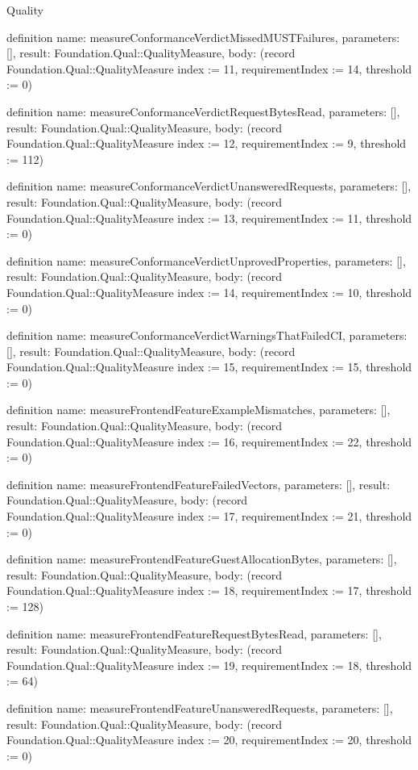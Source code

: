 \begin{lexlean}{Quality}
\begin{semanticmodule}
definition{
  name: measureConformanceVerdictMissedMUSTFailures,
  parameters: [],
  result: Foundation.Qual::QualityMeasure,
  body: (record Foundation.Qual::QualityMeasure {index := 11, requirementIndex := 14, threshold := 0})
}

definition{
  name: measureConformanceVerdictRequestBytesRead,
  parameters: [],
  result: Foundation.Qual::QualityMeasure,
  body: (record Foundation.Qual::QualityMeasure {index := 12, requirementIndex := 9, threshold := 112})
}

definition{
  name: measureConformanceVerdictUnansweredRequests,
  parameters: [],
  result: Foundation.Qual::QualityMeasure,
  body: (record Foundation.Qual::QualityMeasure {index := 13, requirementIndex := 11, threshold := 0})
}

definition{
  name: measureConformanceVerdictUnprovedProperties,
  parameters: [],
  result: Foundation.Qual::QualityMeasure,
  body: (record Foundation.Qual::QualityMeasure {index := 14, requirementIndex := 10, threshold := 0})
}

definition{
  name: measureConformanceVerdictWarningsThatFailedCI,
  parameters: [],
  result: Foundation.Qual::QualityMeasure,
  body: (record Foundation.Qual::QualityMeasure {index := 15, requirementIndex := 15, threshold := 0})
}

definition{
  name: measureFrontendFeatureExampleMismatches,
  parameters: [],
  result: Foundation.Qual::QualityMeasure,
  body: (record Foundation.Qual::QualityMeasure {index := 16, requirementIndex := 22, threshold := 0})
}

definition{
  name: measureFrontendFeatureFailedVectors,
  parameters: [],
  result: Foundation.Qual::QualityMeasure,
  body: (record Foundation.Qual::QualityMeasure {index := 17, requirementIndex := 21, threshold := 0})
}

definition{
  name: measureFrontendFeatureGuestAllocationBytes,
  parameters: [],
  result: Foundation.Qual::QualityMeasure,
  body: (record Foundation.Qual::QualityMeasure {index := 18, requirementIndex := 17, threshold := 128})
}

definition{
  name: measureFrontendFeatureRequestBytesRead,
  parameters: [],
  result: Foundation.Qual::QualityMeasure,
  body: (record Foundation.Qual::QualityMeasure {index := 19, requirementIndex := 18, threshold := 64})
}

definition{
  name: measureFrontendFeatureUnansweredRequests,
  parameters: [],
  result: Foundation.Qual::QualityMeasure,
  body: (record Foundation.Qual::QualityMeasure {index := 20, requirementIndex := 20, threshold := 0})
}


\end{semanticmodule}
\end{lexlean}
